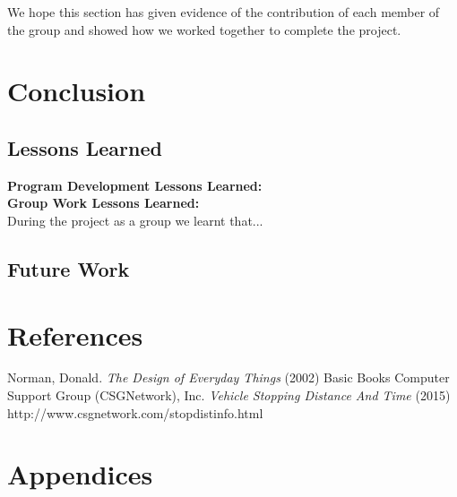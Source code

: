 \documentclass[11pt]{article}
\begin{document}
	We hope this section has given evidence of the contribution of each member of the group and showed how we worked together to complete the project. 
	\section{Conclusion}
	\subsection{Lessons Learned} 
	\textbf{Program Development Lessons Learned:}\\ %
	
	\textbf{Group Work Lessons Learned:}\\ %
	During the project as a group we learnt that...%
	\subsection{Future Work} %
	\section{References}
	
	\begin{thebibliography}{9}
			 Norman, Donald. \emph{The Design of Everyday Things} (2002) Basic Books
			Computer Support Group (CSGNetwork), Inc. \emph{Vehicle Stopping Distance And Time} (2015) http://www.csgnetwork.com/stopdistinfo.html
	\end{thebibliography}
	

	\section{Appendices} %
\end{document}
